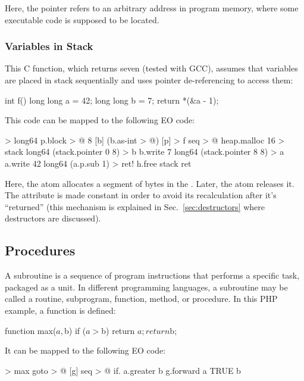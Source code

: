 \documentclass[sigplan,11pt,nonacm,natbib=false]{acmart}
\begin{document}
Here, the pointer refers to an arbitrary address in program memory, where some executable code is supposed to be located.

\subsubsection{Variables in Stack}

This C function, which returns seven (tested with GCC), assumes that variables are placed in stack sequentially and uses pointer de-referencing to access them:

\begin{ffcode}
int f() {
  long long a = 42;
  long long b = 7;
  return *(&a - 1);
}
\end{ffcode}

This code can be mapped to the following EO code:

\begin{ffcode}
[p] > long64
  p.block > @
    8
    [b] (b.as-int > @)
[p] > f
  seq > @
    heap.malloc 16 > stack
    long64 (stack.pointer 0 8) > b
    b.write 7
    long64 (stack.pointer 8 8) > a
    a.write 42
    long64 (a.p.sub 1) > ret!
    h.free stack
    ret
\end{ffcode}

Here, the atom  allocates a segment of bytes in the . Later, the atom  releases it. The attribute  is made constant in order to avoid its recalculation after it's ``returned'' (this mechanism is explained in Sec.~\ref{sec:destructors} where destructors are discussed).

\subsection{Procedures}
\label{sec:procedures}

A subroutine is a sequence of program instructions that performs a specific task, packaged as a unit. In different programming languages, a subroutine may be called a routine, subprogram, function, method, or procedure. In this PHP example, a function  is defined:

\begin{ffcode}
function max($a, $b) {
  if ($a > $b) return $a;
  return $b;
}
\end{ffcode}

It can be mapped to the following EO code:

\begin{ffcode}
[a b] > max
  goto > @
    [g]
      seq > @
        if.
          a.greater b
          g.forward a
          TRUE
        b
\end{ffcode}
\end{document}
